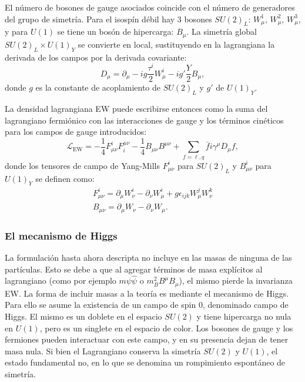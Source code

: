 El número de bosones de gauge asociados coincide con el número de generadores del grupo de simetría. Para el isospín débil hay 3 bosones \(SU(2)_L\): \(W_{\mu}^1,\, W_{\mu}^2,\, W_{\mu}^3\), y para \(U(1)\) se tiene un bosón de hipercarga: \(B_{\mu}\).
La simetría global \(SU(2)_L \times U(1)_Y\) se convierte en local, sustituyendo en la lagrangiana la derivada de los campos por la derivada covariante:
\begin{equation}
    \label{eq:theory:sm:mathematical:ew:covariant_derivative}
    D_{\mu} = \partial_{\mu} - ig \frac{\tau^i}{2} W_{\mu}^i - i g' \frac{Y}{2} B_{\mu},
\end{equation}
donde \(g\) es la constante de acoplamiento de \(SU(2)_L\) y \(g'\) de \(U(1)_Y\).

La densidad lagrangiana \ac{EW} puede escribirse entonces como la suma del lagrangiano fermiónico con las interacciones de gauge y los términos cinéticos para los campos de gauge introducidos:
\begin{equation}
    \mathcal{L}_{\text{EW}} = 
    - \frac{1}{4} F_{\mu\nu}^i F^{\mu\nu}_i
    - \frac{1}{4} B_{\mu\nu} B^{\mu\nu}
    + \sum_{f = \ell, q} \bar{f} i \gamma^{\mu} D_{\mu} f,
\end{equation}
donde los tensores de campo de Yang-Mills \(F_{\mu\nu}^i\) para \(SU(2)_L\) y \(B_{\mu\nu}^i\) para \(U(1)_Y\) se definen como:
\begin{gather}
    F_{\mu\nu}^i = \partial_{\mu} W_{\nu}^i  -  \partial_{\nu} W_{\mu}^i + g \epsilon_{ijk} W_{\mu}^jW_{\nu}^k \\
    B_{\mu\nu} = \partial_{\mu} W_{\nu}  -  \partial_{\nu} W_{\mu}.
\end{gather}




\subsubsection{El mecanismo de Higgs}

La formulación hasta ahora descripta no incluye en las masas de ninguna de las partículas. Esto se debe a que al agregar términos de masa explícitos al lagrangiano (como por ejemplo \(m \psi \hat{\psi}\) o \(m_B^2 B^{\mu}B_{\mu}\)), el mismo pierde la invarianza \ac{EW}. La forma de incluir masas a la teoría es mediante el mecanismo de Higgs. Para ello se asume la existencia de un campo de spin 0, denominado campo de Higgs. El mismo es un doblete en el espacio \(SU(2)\) y tiene hipercarga no nula en \(U(1)\), pero es un singlete en el espacio de color. Los bosones de gauge y los fermiones pueden interactuar con este campo, y en su presencia dejan de tener masa nula. Si bien el Lagrangiano conserva la simetría \(SU(2)\) y \(U(1)\), el estado fundamental no, en lo que se denomina un rompimiento espontáneo de simetría.

